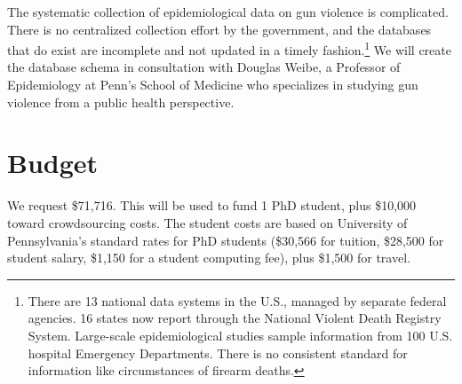 \documentclass[11pt]{article}
\begin{document}
The systematic collection of epidemiological data on gun violence is complicated.  There is no centralized collection effort by the government, and the databases that do exist are incomplete and not updated in a timely fashion.\footnote{
There are 13 national data systems in the U.S., managed by separate federal agencies. 16 states now report through the National Violent Death Registry System.  Large-scale epidemiological studies sample information from 100 U.S. hospital Emergency Departments.   There is no consistent standard for information like circumstances of firearm deaths.
} We will create the database schema in consultation with Douglas Weibe, a Professor of Epidemiology  at Penn's School of Medicine who specializes in studying gun violence from a public health perspective. 




\section{Budget}

We request \$71,716.  This will be used to fund 1 PhD student, plus \$10,000 toward crowdsourcing costs.  The student costs are based on
University of Pennsylvania's standard rates for PhD students (\$30,566
for tuition, \$28,500 for student salary, \$1,150 for a student
computing fee), plus \$1,500 for travel.  
\end{document}
